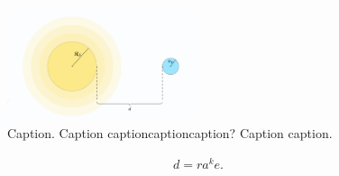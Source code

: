 
\begin{figure}[h!]
    \begin{center}
        \includegraphics[width=0.5\textwidth]{../figs/fig_num_2.pdf}
    \end{center}
    \caption{Caption. Caption captioncaptioncaption? Caption caption.}
    \label{fig: fig_num_2}
\end{figure}

\blindduck

\begin{align}
    \boxed{
        d = ra^k e.
    }
    \label{eq: test_2}
\end{align}

\clearpage

